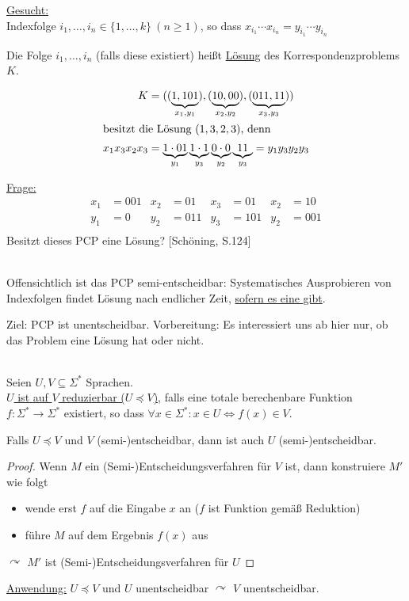 \underline{Gesucht:}\\
Indexfolge $i_1, \dots, i_n \in \{1, \dots, k\}\ (n \geq 1)$, so dass $x_{i_1} \cdots x_{i_n}=y_{i_1} \cdots y_{i_n}$

Die Folge $i_1, \dots, i_n$ (falls diese existiert) heißt \underline{Lösung} des Korrespondenzproblems $K$.
\begin{Bsp*}
\begin{align*}
	K &=((\underbrace{1,101}_{x_1, y_1}), (\underbrace{10, 00}_{x_2, y_2}), (\underbrace{011, 11}_{x_3, y_3}))\\
\shortintertext{besitzt die Lösung $(1,3,2,3)$, denn}
	x_1 x_3 x_2 x_3 &= \underbrace{1 \cdot 01}_{y_1}\underbrace{1 \cdot 1}_{y_3}\underbrace{0 \cdot 0}_{y_2}\underbrace{11}_{y_3} = y_1 y_3 y_2 y_3
\end{align*}
\end{Bsp*}\vspace{-1em}
\underline{Frage:}
\begin{align*}
  x_1&=001 & x_2&=01 & x_3&=01 & x_2&=10\\
  y_1&=0  & y_2&=011 & y_3&=101  & y_2&=001\\
\end{align*}
Besitzt dieses \ac{PCP} eine Lösung? [Schöning, S.124]
\begin{Bemerkung}\ \\
  Offensichtlich ist das \ac{PCP} semi-entscheidbar: Systematisches
  Ausprobieren von Indexfolgen findet Lösung nach endlicher Zeit,
  \underline{sofern es eine gibt}.
\end{Bemerkung}
Ziel: \ac{PCP} ist unentscheidbar. Vorbereitung:
Es interessiert uns ab hier nur, ob das Problem eine Lösung hat oder nicht.
\begin{Def}[Reduktion]\ \\
  Seien $U, V \subseteq \Sigma^*$ Sprachen.\\
  \underline{$U$ ist auf $V$ reduzierbar ($U \preceq V$)}, falls eine totale berechenbare Funktion
  $f:\Sigma^* \to \Sigma^*$ existiert, so dass $\forall x \in \Sigma^*:x \in U \iff f(x) \in V$.
\end{Def}
\begin{lemma}
  Falls $U \preceq V$ und $V$ \mbox{(semi-)entscheidbar}, dann ist auch $U$
  \mbox{(semi-)entscheidbar}.
\end{lemma}\vspace{-1.5em}
\begin{proof}
  Wenn $M$ ein (Semi-)Entscheidungsverfahren für $V$ ist, dann konstruiere $M'$ wie folgt
  \begin{itemize}
  \item wende erst $f$ auf die Eingabe $x$ an ($f$ ist Funktion gemäß Reduktion)
  \item führe $M$ auf dem Ergebnis $f(x)$ aus
  \end{itemize}
  $\curvearrowright$ $M'$ ist (Semi-)Entscheidungsverfahren für $U$
\end{proof}
\underline{Anwendung:} $U \preceq V$ und $U$
unentscheidbar $\curvearrowright$ $V$ unentscheidbar.
